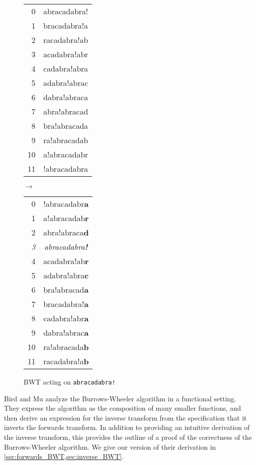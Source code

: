 \documentclass[11pt]{thesis}
\begin{document}
\begin{figure}
  \centering
  \begin{tt}
  \begin{tabular}{rc}
    0  & abracadabra! \\
    1  & bracadabra!a \\
    2  & racadabra!ab \\
    3  & acadabra!abr \\
    4  & cadabra!abra \\
    5  & adabra!abrac \\
    6  & dabra!abraca \\
    7  & abra!abracad \\
    8  & bra!abracada \\
    9  & ra!abracadab \\
    10 & a!abracadabr \\
    11 & !abracadabra
  \end{tabular}
  $\rightarrow$
  \begin{tabular}{rc}
    0  & !abracadabr\textbf{a} \\
    1  & a!abracadab\textbf{r} \\
    2  & abra!abraca\textbf{d} \\
    \textit{3} & \textit{abracadabra\textbf{!}} \\
    4  & acadabra!ab\textbf{r} \\
    5  & adabra!abra\textbf{c} \\
    6  & bra!abracad\textbf{a} \\
    7  & bracadabra!\textbf{a} \\
    8  & cadabra!abr\textbf{a} \\
    9  & dabra!abrac\textbf{a} \\
    10 & ra!abracada\textbf{b} \\
    11 & racadabra!a\textbf{b}
  \end{tabular}
  \end{tt}
  \caption{BWT acting on \texttt{abracadabra!}}
  \label{fig:bw_ex}
\end{figure}

Bird and Mu \cite{birdmu,pearls} analyze the Burrows-Wheeler algorithm
in a functional setting. They express the algorithm as the composition
of many smaller functions, and then derive an expression for the
inverse transform from the specification that it inverts the forwards
transform. In addition to providing an intuitive derivation of the
inverse transform, this provides the outline of a proof of the
correctness of the Burrows-Wheeler algorithm. We give our version of
their derivation in \cref{sec:forwards_BWT,sec:inverse_BWT}.
\end{document}
